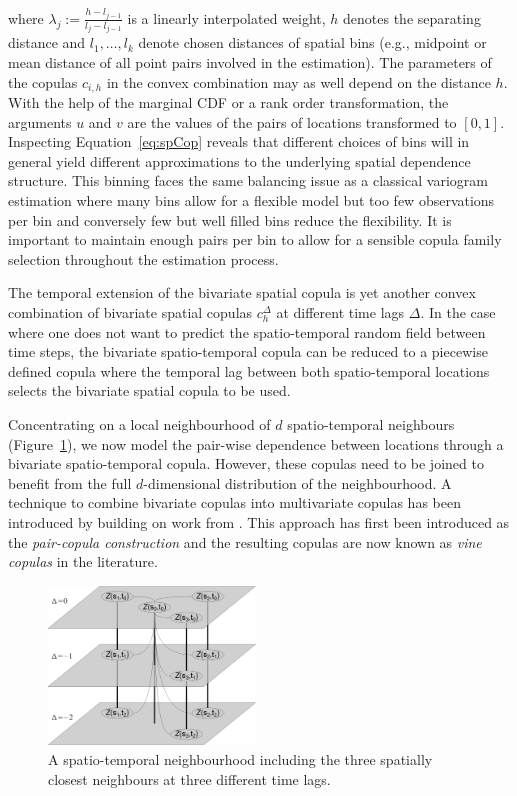 \documentclass[article,nojss]{jss}
\begin{document}
where $\lambda_j := \frac{h-l_{j-1}}{l_j-l_{j-1}}$ is a linearly interpolated weight, $h$ denotes the separating distance and $l_1,\dots,l_k$ denote chosen distances of spatial bins (e.g., midpoint or mean distance of all point pairs involved in the estimation). The parameters of the copulas $c_ {i,h}$ in the convex combination may as well depend on the distance $h$. With the help of the marginal CDF or a rank order transformation, the arguments $u$ and $v$ are the values of the pairs of locations transformed to $[0,1]$. Inspecting Equation~\ref{eq:spCop} reveals that different choices of bins will in general yield different approximations to the underlying spatial dependence structure. This binning faces the same balancing issue as a classical variogram estimation where many bins allow for a flexible model but too few observations per bin and conversely few but well filled bins reduce the flexibility. It is important to maintain enough pairs per bin to allow for a sensible copula family selection throughout the estimation process.

The temporal extension of the bivariate spatial copula is yet another convex combination of bivariate spatial copulas $c_h^\Delta$ at different time lags $\Delta$. In the case where one does not want to predict the spatio-temporal random field between time steps, the bivariate spatio-temporal copula can be reduced to a piecewise defined copula where the temporal lag between both spatio-temporal locations selects the bivariate spatial copula to be used.

Concentrating on a local neighbourhood of $d$ spatio-temporal neighbours (Figure~\ref{fig:stNeigh}), we now model the pair-wise dependence between locations through a bivariate spatio-temporal copula. However, these copulas need to be joined to benefit from the full $d$-dimensional distribution of the neighbourhood. A technique to combine bivariate copulas into multivariate copulas has been introduced by \citet{Aas2009} building on work from \citet{Bedford2002}. This approach has first been introduced as the \emph{pair-copula construction} and the resulting copulas are now known as \emph{vine copulas} in the literature.

\begin{figure}
\center
\includegraphics[width=0.49\textwidth]{st-vine.png} %
\caption{A spatio-temporal neighbourhood including the three spatially closest neighbours at three different time lags.\label{fig:stNeigh}}
\end{figure}
\end{document}
